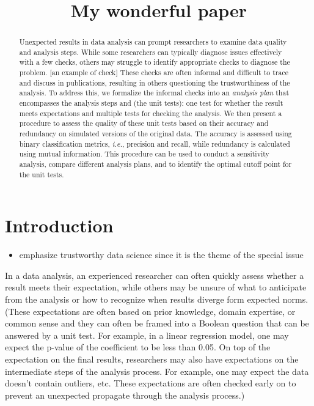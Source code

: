\documentclass[
]{jds}
\title{My wonderful paper}
\author{}
\date{}
\providecommand{\tightlist}{%
  \setlength{\itemsep}{0pt}\setlength{\parskip}{0pt}}\usepackage{longtable,booktabs,array}
\renewcommand*\contentsname{Table of contents}
\newcommand\contentsname{Table of contents}
\begin{document}
\maketitle
\begin{abstract}
Unexpected results in data analysis can prompt researchers to examine
data quality and analysis steps. While some researchers can typically
diagnose issues effectively with a few checks, others may struggle to
identify appropriate checks to diagnose the problem. {[}an example of
check{]} These checks are often informal and difficult to trace and
discuss in publications, resulting in others questioning the
trustworthiness of the analysis. To address this, we formalize the
informal checks into an \emph{analysis plan} that encompasses the
analysis steps and (the unit tests): one test for whether the result
meets expectations and multiple tests for checking the analysis. We then
present a procedure to assess the quality of these unit tests based on
their accuracy and redundancy on simulated versions of the original
data. The accuracy is assessed using binary classification metrics,
\emph{i.e.}, precision and recall, while redundancy is calculated using
mutual information. This procedure can be used to conduct a sensitivity
analysis, compare different analysis plans, and to identify the optimal
cutoff point for the unit tests.
\end{abstract}

\renewcommand*\contentsname{Table of contents}
{
\hypersetup{linkcolor=}
\setcounter{tocdepth}{3}
\tableofcontents
}

\newpage

\section{Introduction}\label{introduction}

\begin{itemize}
\tightlist
\item
  emphasize trustworthy data science since it is the theme of the
  special issue
\end{itemize}

In a data analysis, an experienced researcher can often quickly assess
whether a result meets their expectation, while others may be unsure of
what to anticipate from the analysis or how to recognize when results
diverge form expected norms. (These expectations are often based on
prior knowledge, domain expertise, or common sense and they can often be
framed into a Boolean question that can be answered by a unit test. For
example, in a linear regression model, one may expect the p-value of the
coefficient to be less than 0.05. On top of the expectation on the final
results, researchers may also have expectations on the intermediate
steps of the analysis process. For example, one may expect the data
doesn't contain outliers, etc. These expectations are often checked
early on to prevent an unexpected propagate through the analysis
process.)
\end{document}
